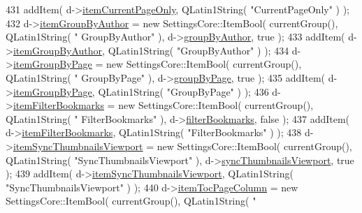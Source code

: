 \begin{DoxyCode}
431   addItem( d->\hyperlink{classOkular_1_1SettingsPrivate_ad0d5cbc1d3c00e0f1008fa7cf5248f5b}{itemCurrentPageOnly}, QLatin1String( \textcolor{stringliteral}{"CurrentPageOnly"} ) );
432   d->\hyperlink{classOkular_1_1SettingsPrivate_a57a785999d9858210969231df3bcaa09}{itemGroupByAuthor} = \textcolor{keyword}{new} SettingsCore::ItemBool( currentGroup(), QLatin1String( \textcolor{stringliteral}{"
      GroupByAuthor"} ), d->\hyperlink{classOkular_1_1SettingsPrivate_a318c47ddf7d2f0ee5688930d2bde7adb}{groupByAuthor}, \textcolor{keyword}{true} );
433   addItem( d->\hyperlink{classOkular_1_1SettingsPrivate_a57a785999d9858210969231df3bcaa09}{itemGroupByAuthor}, QLatin1String( \textcolor{stringliteral}{"GroupByAuthor"} ) );
434   d->\hyperlink{classOkular_1_1SettingsPrivate_adcb32a4d1392e9650541dfbbf7b22dff}{itemGroupByPage} = \textcolor{keyword}{new} SettingsCore::ItemBool( currentGroup(), QLatin1String( \textcolor{stringliteral}{"
      GroupByPage"} ), d->\hyperlink{classOkular_1_1SettingsPrivate_a9281d10efd51e2db1aca3b77486837da}{groupByPage}, \textcolor{keyword}{true} );
435   addItem( d->\hyperlink{classOkular_1_1SettingsPrivate_adcb32a4d1392e9650541dfbbf7b22dff}{itemGroupByPage}, QLatin1String( \textcolor{stringliteral}{"GroupByPage"} ) );
436   d->\hyperlink{classOkular_1_1SettingsPrivate_a75423605407f669f478df13cf97265a0}{itemFilterBookmarks} = \textcolor{keyword}{new} SettingsCore::ItemBool( currentGroup(), QLatin1String( \textcolor{stringliteral}{"
      FilterBookmarks"} ), d->\hyperlink{classOkular_1_1SettingsPrivate_a0b97ff99fdd60cfcd3ee5da1f223343a}{filterBookmarks}, \textcolor{keyword}{false} );
437   addItem( d->\hyperlink{classOkular_1_1SettingsPrivate_a75423605407f669f478df13cf97265a0}{itemFilterBookmarks}, QLatin1String( \textcolor{stringliteral}{"FilterBookmarks"} ) );
438   d->\hyperlink{classOkular_1_1SettingsPrivate_a86acbdfc27d562a3ba7c66b821b1f3d1}{itemSyncThumbnailsViewport} = \textcolor{keyword}{new} SettingsCore::ItemBool( currentGroup(), 
      QLatin1String( \textcolor{stringliteral}{"SyncThumbnailsViewport"} ), d->\hyperlink{classOkular_1_1SettingsPrivate_a567633dcf70a6083fde5ef44fdbe2686}{syncThumbnailsViewport}, \textcolor{keyword}{true} );
439   addItem( d->\hyperlink{classOkular_1_1SettingsPrivate_a86acbdfc27d562a3ba7c66b821b1f3d1}{itemSyncThumbnailsViewport}, QLatin1String( \textcolor{stringliteral}{"SyncThumbnailsViewport"}
       ) );
440   d->\hyperlink{classOkular_1_1SettingsPrivate_ab294003c378fb7baf06b6de74950a085}{itemTocPageColumn} = \textcolor{keyword}{new} SettingsCore::ItemBool( currentGroup(), QLatin1String( \textcolor{stringliteral}{"
}
\end{DoxyCode}
